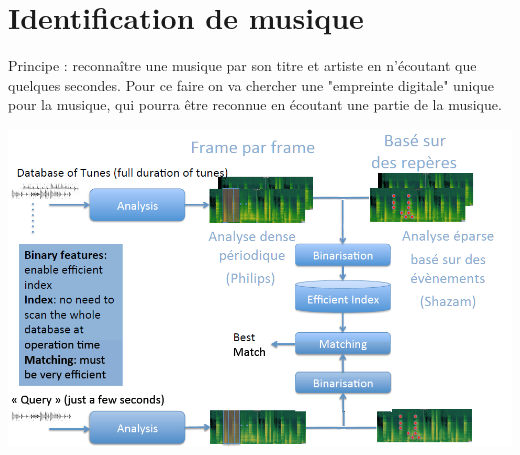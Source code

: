 \documentclass[letterpaper, 12pt]{article}
\newcommand{\alinea}{
\hspace*{0.5cm}}
\begin{document}
	\section{Identification de musique}
		\alinea Principe : reconnaître une musique par son titre et artiste en n'écoutant que quelques secondes.
			Pour ce faire on va chercher une "empreinte digitale" unique pour la musique, qui pourra être reconnue en écoutant
			une partie de la musique.
		\begin{center}
			\includegraphics[width=6in]{Images/music_ID}
		\end{center}
\end{document}
